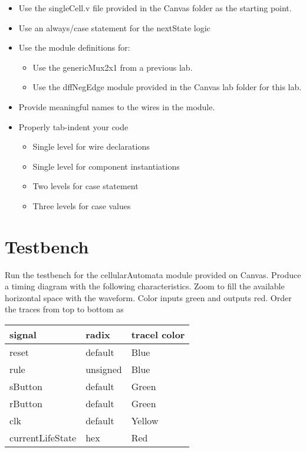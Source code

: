\begin{itemize}
\item
  Use the singleCell.v file provided in the Canvas folder as the
  starting point.
\item
  Use an always/case statement for the nextState logic
\item
  Use the module definitions for:

  \begin{itemize}
  \item
    Use the genericMux2x1 from a previous lab.
  \item
    Use the dffNegEdge module provided in the Canvas lab folder for this
    lab.
  \end{itemize}
\item
  Provide meaningful names to the wires in the module.
\item
  Properly tab-indent your code

  \begin{itemize}
  \item
    Single level for wire declarations
  \item
    Single level for component instantiations
  \item
    Two levels for case statement
  \item
    Three levels for case values
  \end{itemize}
\end{itemize}

\section{Testbench}
\label{section:caTestbench}

  Run the testbench for the cellularAutomata module provided on Canvas.
  Produce a timing diagram with the following characteristics. Zoom to
  fill the available horizontal space with the waveform. Color inputs
  green and outputs red. Order the traces from top to bottom as

\begin{tabular}{p{4cm}p{4cm}p{4cm}}
signal		& radix				& tracel color \\ \hline
    reset 			& default 			& Blue  \\ 
    rule 			&  unsigned 			& Blue \\ 
    sButton 			& default 		& Green \\ 
    rButton 			& default 		& Green \\ 
    clk 				& default 		& Yellow \\ 
    currentLifeState 	& hex 			& Red \\
  \end{tabular}


